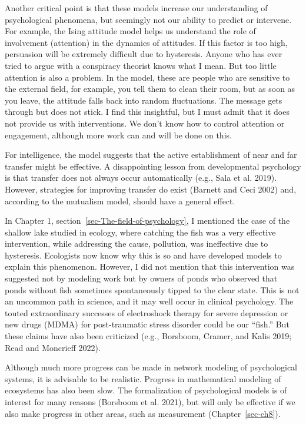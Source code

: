 \documentclass[
  a4paper,
  DIV=11,
  numbers=noendperiod,
  oneside]{scrreprt}
\let\oldmarginnote\marginnote
\renewcommand{\marginnote}[1]{%
\oldmarginnote{\setstretch{0.8}\selectfont#1}%
}
\begin{document}
Another critical point is that these models increase our understanding
of psychological phenomena, but seemingly not our ability to predict or
intervene. For example, the Ising attitude model helps us understand the
role of involvement (attention) in the dynamics of attitudes. If this
factor is too high, persuasion will be extremely difficult due to
hysteresis. Anyone who has ever tried to argue with a conspiracy
theorist knows what I mean. But too little attention is also a problem.
In the model, these are people who are sensitive to the external field,
for example, you tell them to clean their room, but as soon as you
leave, the attitude falls back into random fluctuations. The message
gets through but does not stick. I find this insightful, but I must
admit that it does not provide us with interventions. We don't know how
to control attention or engagement, although more work can and will be
done on this.

For intelligence, the model suggests that the active establishment of
near and far transfer might be effective. A disappointing lesson from
developmental psychology is that transfer does not always occur
automatically (e.g., Sala et al. 2019). However, strategies for
improving transfer do exist (Barnett and Ceci 2002) and, according to
the mutualism model, should have a general effect.

In Chapter 1, section~\ref{sec-The-field-of-psychology}, I mentioned the
case of the shallow lake studied in ecology, where catching the fish was
a very effective intervention, while addressing the cause, pollution,
was ineffective due to hysteresis. Ecologists now know why this is so
and have developed models to explain this phenomenon. However, I did not
mention that this intervention was suggested not by modeling work but by
owners of ponds who observed that ponds without fish sometimes
spontaneously tipped to the clear state. This is not an uncommon path in
science, and it may well occur in clinical psychology. The touted
extraordinary successes of electroshock therapy for severe depression or
new drugs (MDMA) for post-traumatic stress disorder could be our
``fish.'' But these claims have also been criticized (e.g., Borsboom,
Cramer, and Kalis 2019; Read and Moncrieff 2022).

Although much more progress can be made in network modeling of
psychological systems, it is advisable to be realistic. Progress in
mathematical modeling of ecosystems has also been slow.
{\marginnote{\begin{footnotesize}Ecosystems and human systems are
devilishly complex.\end{footnotesize}}} The formalization of
psychological models is of interest for many reasons (Borsboom et al.
2021), but will only be effective if we also make progress in other
areas, such as measurement (Chapter~\ref{sec-ch8}).
\end{document}
